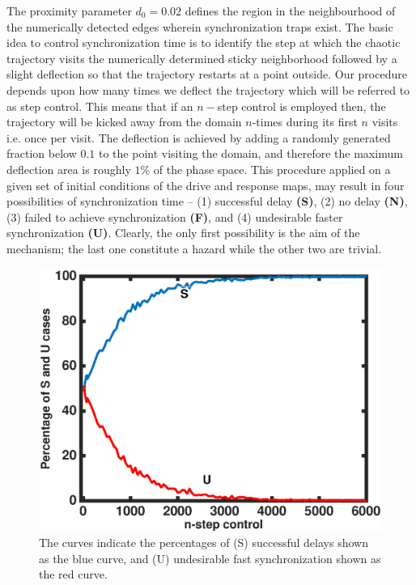\documentclass[reprint,superscriptaddress,amsmath,amssymb,aps,pre]{revtex4-1}
\begin{document}
The proximity parameter $d_0 = 0.02$ defines the region in the neighbourhood of the numerically detected edges wherein synchronization traps exist. The basic idea to control synchronization time is to identify the step at which the chaotic trajectory visits the numerically determined sticky neighborhood followed by a slight deflection so that the trajectory restarts at a point outside.  Our procedure depends upon how many times we deflect the trajectory  which will be referred to as step control. This means that if an $n-$step control is  employed then, the trajectory will be kicked away from the domain $n$-times during its first $n$ visits i.e. once per visit. The deflection is achieved by adding a randomly generated fraction below $0.1$ to the point visiting the domain, and therefore the maximum deflection area is roughly $1\%$ of the phase space.  This procedure applied on a given set of initial conditions of the drive and response maps, may result in four possibilities of synchronization time -- (1) successful delay  \textbf{(S)}, (2) no delay \textbf{(N)}, (3) failed to achieve synchronization \textbf{(F)}, and (4) undesirable faster synchronization \textbf{(U)}. Clearly, the only first possibility is the aim of the mechanism; the last one constitute a hazard while the other two are trivial. 
\begin{figure}[h]
	\includegraphics[scale=0.45]{S_U_Percent}
	\caption{\label{fig:Control_success}\footnotesize The curves indicate the 
		percentages of (S) successful delays shown as the blue curve, and (U) 
		undesirable fast synchronization shown as the red curve. }
\end{figure}
\end{document}
